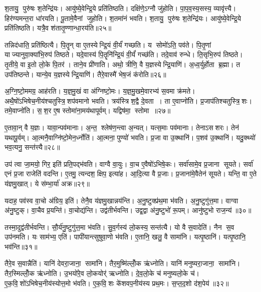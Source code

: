 श॒तायु॒ पुरु॑षः श॒तेन्द्रि॑यः।
आयु॑ष्ये॒वेन्द्रि॒ये प्रति॑तिष्ठति।
दक्षि॑णे॒ऽग्नौ जु॑होति।
पा॒प॒व॒स्य॒सस्य॒ व्यावृ॑त्त्यै।
हिर॑ण्यमन्त॒रा धा॑रयति।
पू॒तामे॒वैनां जुहोति।
श॒तमा॑नं भवति।
श॒तायु॒ पुरु॑षः श॒तेन्द्रि॑यः।
आयु॑ष्ये॒वेन्द्रि॒ये प्रति॑तिष्ठति।
यत्रै॒व श॑तातृ॒ण्णान्धा॒रय॑ति॥२५॥

तन्निद॑धाति॒ प्रति॑ष्ठित्यै।
पि॒तॄन् वा ए॒तस्येन्द्रि॒यं वी॒र्यं॑ गच्छति।
य सोमो॑ऽति॒ पव॑ते।
पि॒तृ॒णां याज्यानुवा॒क्या॑भि॒रुप॑ तिष्ठते।
यदे॒वास्य॑ पि॒तॄनि॑न्द्रि॒यं वी॒र्यं॑ गच्छ॑ति।
तदे॒वाव॑ रुन्धे।
ति॒सृभि॒रुप॑ तिष्ठते।
तृ॒तीये॒ वा इ॒तो लो॒के पि॒तर॑।
ताने॒व प्री॑णाति।
अथो॒ त्रीणि॒ वै य॒ज्ञस्येन्द्रि॒याणि॑।
अ॒ध्व॒र्युर्\mbox{}होता ब्र॒ह्मा।
त उप॑तिष्ठन्ते।
यान्ये॒व य॒ज्ञस्येन्द्रि॒याणि॑।
तैरे॒वास्मै॑ भेष॒जं क॑रोति॥२६॥\anuvakamend[प्री॒णा॒ति॒ प्र॒थ॒मो दक्षि॑णा स॒मव॑नयति धा॒रय॑तीन्द्रि॒याणि॑ च॒त्वारि॑ च]

अ॒ग्नि॒ष्टो॒ममग्र॒ आह॑रति।
य॒ज्ञ॒मु॒खं वा अ॑ग्निष्टो॒मः।
य॒ज्ञ॒मु॒खमे॒वारभ्य॑ स॒वमा क्र॑मते।
अथै॒षो॑ऽभिषेच॒नीय॑श्चतुस्त्रि॒शप॑वमानो भवति।
त्रय॑स्त्रिश॒द्वै दे॒वता।
ता ए॒वाप्नो॑ति।
प्र॒जाप॑तिश्चतुस्त्रि॒शः।
तमे॒वाप्नो॑ति।
स॒श॒र ए॒ष स्तोमा॑ना॒मय॑थापूर्वम्।
यद्विष॑मा॒ स्तोमा॥२७॥

ए॒तावा॒न् वै य॒ज्ञः।
यावा॒न्पव॑मानाः।
अ॒न्त॒ श्लेष॑ण॒न्त्वा अ॒न्यत्।
यत्स॒माः पव॑मानाः।
तेनाऽसशरः।
तेन॑ यथापू॒र्वम्।
आ॒त्मनै॒वाग्नि॑ष्टो॒मेन॒र्ध्नोति॑।
आ॒त्मना॒ पुण्यो॑ भवति।
प्र॒जा वा उ॒क्थानि॑।
प॒शव॑ उ॒क्थानि॑।
यदु॒क्थ्यो॑ भव॒त्यनु॒ सन्त॑त्त्यै॥२८॥\anuvakamend[स्तोमा प॒शव॑ उ॒क्थान्येकं च]

उप॑ त्वा जा॒मयो॒ गिर॒ इति॑ प्रति॒पद्भ॑वति।
वाग्वै वा॒युः।
वा॒च ए॒वैषो॑ऽभिषे॒कः।
सर्वा॑सामे॒व प्र॒जाना सूयते।
सर्वा॑ एनं प्र॒जा राजेति॑ वदन्ति।
ए॒तमु॒ त्यन्दश॒ क्षिप॒ इत्या॑ह।
आ॒दि॒त्या वै प्र॒जाः।
प्र॒जाना॑मे॒वैतेन॑ सूयते।
यन्ति॒ वा ए॒ते य॑ज्ञमु॒खात्।
ये स॑म्भा॒र्या॑ अक्र\sn{}॥२९॥

यदाह॒ पव॑स्व वा॒चो अ॑ग्रिय॒ इति॑।
तेनै॒व य॑ज्ञमु॒खान्नय॑न्ति।
अ॒नु॒ष्टुक्प्र॑थ॒मा भ॑वति।
अ॒नु॒ष्टुगु॑त्त॒मा।
वाग्वा अ॑नु॒ष्टुक्।
वा॒चैव प्र॒यन्ति॑।
वा॒चोद्य॑न्ति।
उद्व॑तीर्भवन्ति।
उद्व॒द्वा अ॑नु॒ष्टुभो॑ रू॒पम्।
आनु॑ष्टुभो राज॒न्य॑॥३०॥

तस्मा॒दुद्व॑तीर्भवन्ति।
सौ॒र्य॑नु॒ष्टुगु॑त्त॒मा भ॑वति।
सु॒व॒र्गस्य॑ लो॒कस्य॒ सन्त॑त्यै।
यो वै स॒वादेति॑।
नैन स॒व उप॑नमति।
यः साम॑भ्य॒ एति॑।
पापी॑यान्त्सुषुवा॒णो भ॑वति।
ए॒तानि॒ खलु॒ वै सामा॑नि।
यत्पृ॒ष्ठानि॑।
यत्पृ॒ष्ठानि॒ भव॑न्ति॥३१॥

तैरे॒व स॒वान्नैति॑।
यानि॑ देवरा॒जाना॒ सामा॑नि।
तैर॒मुष्मि॑ल्लोँ॒क ऋ॑ध्नोति।
यानि॑ मनुष्यरा॒जाना॒ सामा॑नि।
तैर॒स्मिल्लोँ॒क ऋ॑ध्नोति।
उ॒भयो॑रे॒व लो॒कयोर्॑ ऋध्नोति।
दे॒व॒लो॒के च॑ मनुष्यलो॒के च॑।
ए॒क॒वि॒शो॑ऽभिषेच॒नीय॑स्योत्त॒मो भ॑वति।
ए॒क॒वि॒शः के॑शवप॒नीय॑स्य प्रथ॒मः।
स॒प्त॒द॒शो द॑श॒पेय॑॥३२॥

